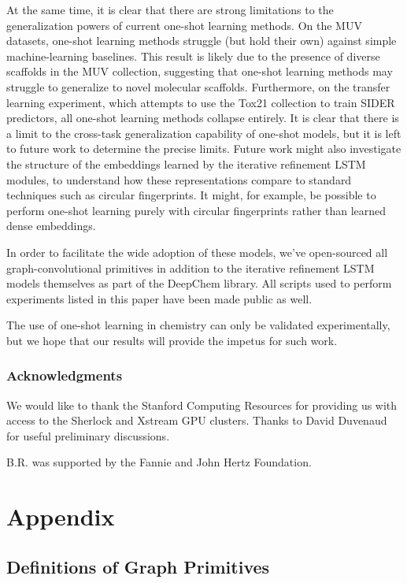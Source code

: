 \documentclass[journal=jacsat,manuscript=article]{achemso}
\begin{document}
At the same time, it is clear that there are strong limitations to the generalization powers of current one-shot learning methods. On the MUV datasets, one-shot learning methods struggle (but hold their own) against simple machine-learning baselines. This result is likely due to the presence of diverse scaffolds in the MUV collection, suggesting that one-shot learning methods may struggle to generalize to novel molecular scaffolds. Furthermore, on the transfer learning experiment, which attempts to use the Tox21 collection to train SIDER predictors, all one-shot learning methods collapse entirely. It is clear that there is a limit to the cross-task generalization capability of one-shot models, but it is left to future work to determine the precise limits. Future work might also investigate the structure of the embeddings learned by the iterative refinement LSTM modules, to understand how these representations compare to standard techniques such as circular fingerprints. It might, for example, be possible to perform one-shot learning purely with circular fingerprints rather than learned dense embeddings.

In order to facilitate the wide adoption of these models, we've open-sourced all graph-convolutional primitives in addition to the iterative refinement LSTM models themselves as part of the DeepChem library. All scripts used to perform experiments listed in this paper have been made public as well.

The use of one-shot learning in chemistry can only be validated experimentally, but we hope that our results will provide the impetus for such work.

\subsubsection*{Acknowledgments}

We would like to thank the Stanford Computing Resources for providing us with access to the Sherlock and Xstream GPU clusters. Thanks to David Duvenaud for useful preliminary discussions.

B.R. was supported by the Fannie and John Hertz Foundation.

\section{Appendix}

\subsection{Definitions of Graph Primitives}
\end{document}
